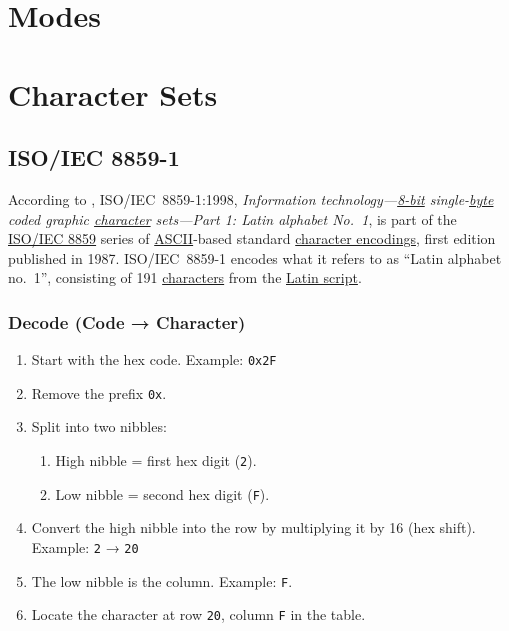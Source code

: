 \documentclass[../../2_specs]{subfiles}
\begin{document}
\section{Modes}

\section{Character Sets}

\subsection{ISO/IEC 8859-1}

According to \textcite{wikipedia-ISO-8859-1}, ISO/IEC~8859-1:1998, \emph{Information technology---\href{https://en.wikipedia.org/wiki/8-bit_computing}{8-bit} single-\href{https://en.wikipedia.org/wiki/Byte}{byte} coded graphic \href{https://en.wikipedia.org/wiki/Character_(computing)}{character} sets---Part 1: Latin alphabet No.~1}, is part of the \href{https://en.wikipedia.org/wiki/ISO/IEC_8859}{ISO/IEC 8859} series of \href{https://en.wikipedia.org/wiki/ASCII}{ASCII}-based standard \href{https://en.wikipedia.org/wiki/Character_encoding}{character encodings}, first edition published in 1987. ISO/IEC~8859-1 encodes what it refers to as ``Latin alphabet no.~1'', consisting of 191 \href{https://en.wikipedia.org/wiki/Character_(computing)}{characters} from the \href{https://en.wikipedia.org/wiki/Latin_script}{Latin script}.


\subsubsection{Decode (Code → Character)}

\begin{enumerate}
    \item Start with the hex code. Example: \texttt{0x2F}
    \item Remove the prefix \texttt{0x}.
    \item Split into two nibbles:
    \begin{enumerate}[label=\alph*.]
        \item High nibble = first hex digit (\texttt{2}).
        \item Low nibble = second hex digit (\texttt{F}).
    \end{enumerate}
    \item Convert the high nibble into the row by multiplying it by 16 (hex shift). Example: \texttt{2} → \texttt{20}
    \item The low nibble is the column. Example: \texttt{F}.
    \item Locate the character at row \texttt{20}, column \texttt{F} in the table.
\end{enumerate}
\end{document}
